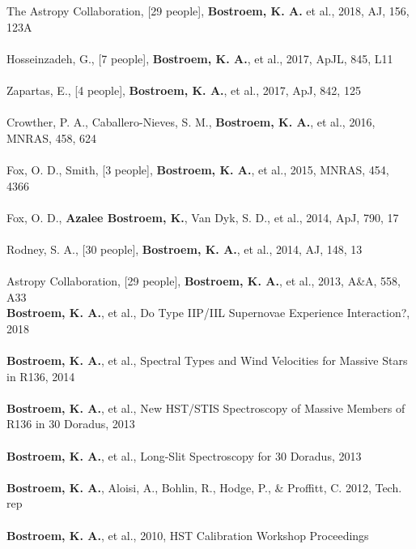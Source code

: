 \documentclass[10pt]{cv}
\begin{document}
\begin{llist}
The Astropy Collaboration, [29 people], {\bf Bostroem, K. A.} et al., 2018, AJ, 156, 123A\\
\\
Hosseinzadeh, G., [7 people], {\bf Bostroem, K. A.}, et al., 2017, ApJL, 845, L11\\ %
\\
Zapartas, E., [4 people], {\bf Bostroem, K. A.}, et al., 2017, ApJ, 842, 125\\ %
\\
Crowther, P. A., Caballero-Nieves, S. M., {\bf Bostroem, K. A.}, et al., 2016, MNRAS, 458, 624\\
\\
Fox, O. D., Smith, [3 people], {\bf Bostroem, K. A.}, et al., 2015, MNRAS, 454, 4366\\
\\
Fox, O. D., {\bf Azalee Bostroem, K.}, Van Dyk, S. D., et al., 2014, ApJ, 790, 17\\
\\
Rodney, S. A., [30 people], {\bf Bostroem, K. A.}, et al., 2014, AJ, 148, 13\\
\\
Astropy Collaboration, [29 people], {\bf Bostroem, K. A.}, et al., 2013, A\&A, 558, A33 \\
%
\vspace{-0.1in}   
{\bf Bostroem, K. A.}, et al., Do Type IIP/IIL Supernovae Experience Interaction?, 2018\\
\\
{\bf Bostroem, K. A.}, et al., Spectral Types and Wind Velocities for Massive Stars in R136, 2014\\
\\
{\bf Bostroem, K. A.}, et al., New HST/STIS Spectroscopy of Massive Members of R136 in 30 Doradus, 2013\\
\\
{\bf Bostroem, K. A.}, et al., Long-Slit Spectroscopy for 30 Doradus, 2013\\
\\
{\bf Bostroem, K. A.}, Aloisi, A., Bohlin, R., Hodge, P., \& Proffitt, C. 2012, Tech. rep \\%
\\
\textbf{Bostroem, K. A.}, et al., 2010, HST Calibration Workshop Proceedings%
\\

\end{llist}
\end{document}
